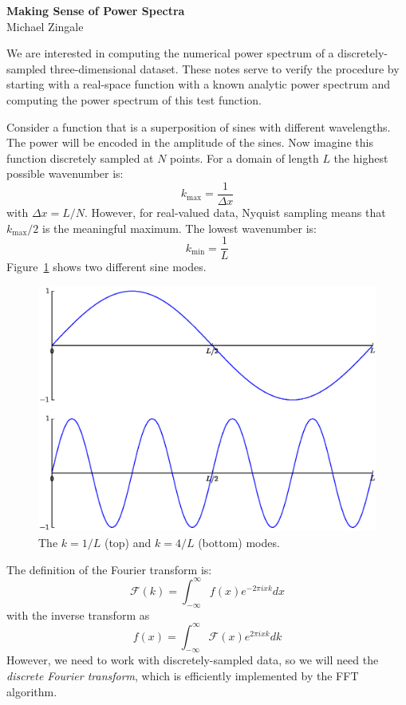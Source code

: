 \documentclass[11pt]{article}
\begin{document}
\begin{center}
{\bfseries \sffamily \LARGE Making Sense of Power Spectra} \\
Michael Zingale
\end{center}

We are interested in computing the numerical power spectrum of a
discretely-sampled three-dimensional dataset.  These notes serve
to verify the procedure by starting with a real-space
function with a known analytic power spectrum and computing the
power spectrum of this test function.

Consider a function that is a superposition of sines with different
wavelengths.  The power will be encoded in the amplitude of the sines.
Now imagine this function discretely sampled at $N$ points.  For a domain of
length $L$ the highest possible wavenumber is:
\begin{equation}
k_\mathrm{max} = \frac{1}{\Delta x}
\end{equation}
with $\Delta x = L/N$.  However, for real-valued data, Nyquist sampling
means that $k_\mathrm{max}/2$ is the meaningful maximum.
The lowest wavenumber is:
\begin{equation}
k_\mathrm{min} = \frac{1}{L}
\end{equation}
Figure~\ref{fig:wavenumbers} shows two different sine modes.

\suppressfloats

\begin{figure}[t]
\centering
\includegraphics[width=0.75\linewidth]{wavenumber}
\caption{\label{fig:wavenumbers} The $k = 1/L$ (top) and $k = 4/L$ (bottom)
modes.}
\end{figure}


The definition of the Fourier transform is:
\begin{equation}
\mathcal{F}(k) = \int_{-\infty}^{\infty} f(x) e^{-2\pi i x k} dx
\end{equation}
with the inverse transform as
\begin{equation}
f(x) = \int_{-\infty}^{\infty} \mathcal{F}(x) e^{2\pi i x k} dk
\end{equation}
However, we need to work with discretely-sampled data, so we will need
the {\em discrete Fourier transform}, which is efficiently implemented by
the FFT algorithm.
\end{document}

